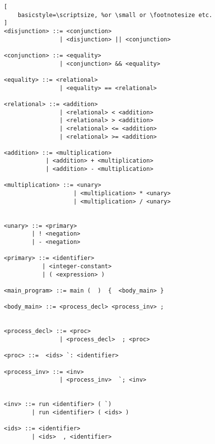 \begin{lstlisting}[
    basicstyle=\scriptsize, %or \small or \footnotesize etc.
]
<disjunction> ::= <conjunction> 
                | <disjunction> || <conjunction>
                
<conjunction> ::= <equality> 
                | <conjunction> && <equality>

<equality> ::= <relational> 
                | <equality> == <relational>

<relational> ::= <addition>
                | <relational> < <addition>
                | <relational> > <addition>
                | <relational> <= <addition>
                | <relational> >= <addition>

<addition> ::= <multiplication>
            | <addition> + <multiplication>
            | <addition> - <multiplication>

<multiplication> ::= <unary>
                    | <multiplication> * <unary>
                    | <multiplication> / <unary>

                
<unary> ::= <primary>
        | ! <negation> 
        | - <negation> 

<primary> ::= <identifier>
           | <integer-constant>
           | ( <expression> )

<main_program> ::= main (  )  {  <body_main> } 

<body_main> ::= <process_decl> <process_inv> ;


<process_decl> ::= <proc> 
                | <process_decl>  ; <proc>

<proc> ::=  <ids> `: <identifier> 
              
<process_inv> ::= <inv> 
                | <process_inv>  `; <inv>


<inv> ::= run <identifier> ( `)
        | run <identifier> ( <ids> )

<ids> ::= <identifier> 
        | <ids>  , <identifier>
\end{lstlisting}
